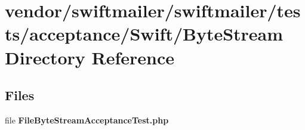 \section{vendor/swiftmailer/swiftmailer/tests/acceptance/\+Swift/\+Byte\+Stream Directory Reference}
\label{dir_e0793629e7ed5656a4cf3926ad9a7535}
\subsection*{Files}
\begin{DoxyCompactItemize}
\item 
file {\bf File\+Byte\+Stream\+Acceptance\+Test.\+php}
\end{DoxyCompactItemize}
